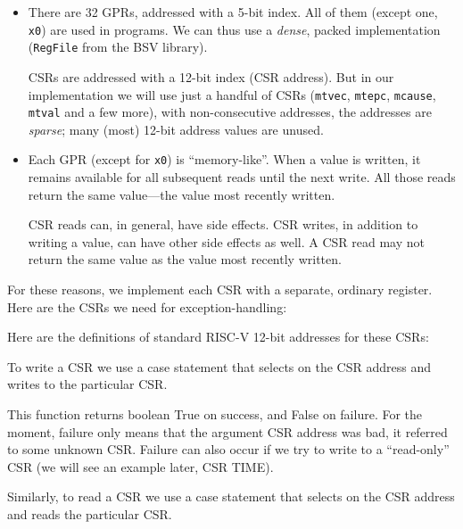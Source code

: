 \begin{itemize}

 \item There are 32 GPRs, addressed with a 5-bit index.  All of them
       (except one, \verb|x0|) are used in programs.  We can thus use
       a \emph{dense}, packed implementation (\verb|RegFile| from the
       BSV library).

       CSRs are addressed with a 12-bit index (CSR address).  But in
       our implementation we will use just a handful of CSRs
       (\verb|mtvec|, \verb|mtepc|, \verb|mcause|, \verb|mtval| and a
       few more), with non-consecutive addresses, {\ie} the addresses
       are \emph{sparse}; many (most) 12-bit address values are
       unused.

 \item Each GPR (except for \verb|x0|) is ``memory-like''.  When a
       value is written, it remains available for all subsequent reads
       until the next write.  All those reads return the same
       value---the value most recently written.

       CSR reads can, in general, have side effects.  CSR writes, in
       addition to writing a value, can have other side effects as
       well.  A CSR read may not return the same value as the value
       most recently written.

\end{itemize}

For these reasons, we implement each CSR with a separate, ordinary
register.  Here are the CSRs we need for exception-handling:


Here are the definitions of standard RISC-V 12-bit addresses for these
CSRs:


To write a CSR we use a case statement that selects on the CSR
address and writes to the particular CSR.


This function returns boolean True on success, and False on failure.
For the moment, failure only means that the argument CSR address was
bad, {\ie} it referred to some unknown CSR.  Failure can also occur if
we try to write to a ``read-only'' CSR (we will see an example later,
CSR TIME).

Similarly, to read a CSR we use a case statement that selects on the
CSR address and reads the particular CSR.

